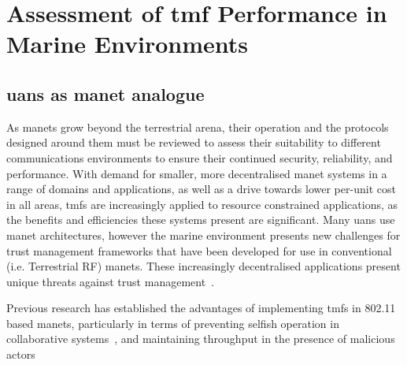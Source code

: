 
\chapter{Assessment of \gls{tmf} Performance in Marine Environments}
\label{ch:comms_trust}

\section{\glspl{uan} as \gls{manet} analogue}


As \glspl{manet} grow beyond the terrestrial arena, their operation and the protocols designed around them must be reviewed to assess their suitability to different communications environments to ensure their continued security, reliability, and performance.
With demand for smaller, more decentralised \gls{manet} systems in a range of domains and applications, as well as a drive towards lower per-unit cost in all areas, \glspl{tmf} are increasingly applied to resource constrained applications, as the benefits and efficiencies these systems present are significant.
Many \glspl{uan} use \gls{manet} architectures, however the marine environment presents new challenges for trust management frameworks that have been developed for use in conventional (i.e. Terrestrial RF) \glspl{manet}.
These increasingly decentralised applications present unique threats against trust management~\cite{Caiti2011}.

Previous research has established the advantages of implementing \glspl{tmf} in 802.11 based \glspl{manet}, particularly in terms of preventing selfish operation in collaborative systems~\cite{Li2007}, and maintaining throughput in the presence of malicious actors~\cite{Buchegger2002}

